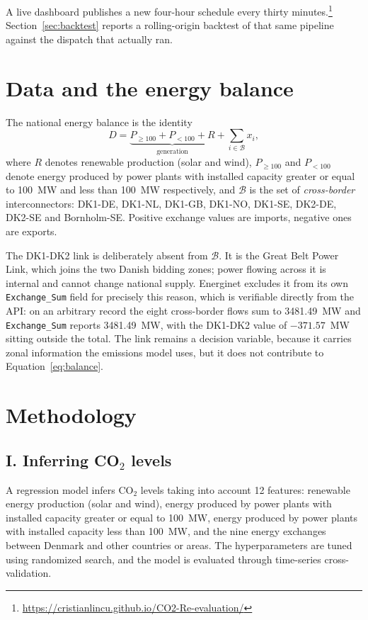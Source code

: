 \documentclass[11pt]{article}
\begin{document}
A live dashboard publishes a new four-hour schedule every thirty
minutes.\footnote{\url{https://cristianlincu.github.io/CO2-Re-evaluation/}}
Section~\ref{sec:backtest} reports a rolling-origin backtest of that same
pipeline against the dispatch that actually ran.

\section{Data and the energy balance}
\label{sec:data}

The national energy balance is the identity
\begin{equation}
D = \underbrace{P_{\ge 100} + P_{< 100} + R}_{\text{generation}} + \sum_{i \in \mathcal{B}} x_i ,
\label{eq:balance}
\end{equation}
where $R$ denotes renewable production (solar and wind), $P_{\ge 100}$ and
$P_{< 100}$ denote energy produced by power plants with installed capacity
greater or equal to 100~MW and less than 100~MW respectively, and
$\mathcal{B}$ is the set of \emph{cross-border} interconnectors: DK1-DE,
DK1-NL, DK1-GB, DK1-NO, DK1-SE, DK2-DE, DK2-SE and Bornholm-SE. Positive
exchange values are imports, negative ones are exports.

The DK1-DK2 link is deliberately absent from $\mathcal{B}$. It is the Great
Belt Power Link, which joins the two Danish bidding zones; power flowing
across it is internal and cannot change national supply. Energinet excludes
it from its own \texttt{Exchange\_Sum} field for precisely this reason,
which is verifiable directly from the API: on an arbitrary record the eight
cross-border flows sum to 3481.49~MW and \texttt{Exchange\_Sum} reports
3481.49~MW, with the DK1-DK2 value of $-371.57$~MW sitting outside the
total. The link remains a decision variable, because it carries zonal
information the emissions model uses, but it does not contribute to
Equation~\eqref{eq:balance}.

\section{Methodology}

\subsection{I. Inferring CO\texorpdfstring{$_2$}{2} levels}
\label{sec:co2}

A regression model infers CO$_2$ levels taking into account 12 features:
renewable energy production (solar and wind), energy produced by power plants
with installed capacity greater or equal to 100~MW, energy produced by power
plants with installed capacity less than 100~MW, and the nine energy exchanges
between Denmark and other countries or areas. The hyperparameters are tuned
using randomized search, and the model is evaluated through time-series
cross-validation.
\end{document}
